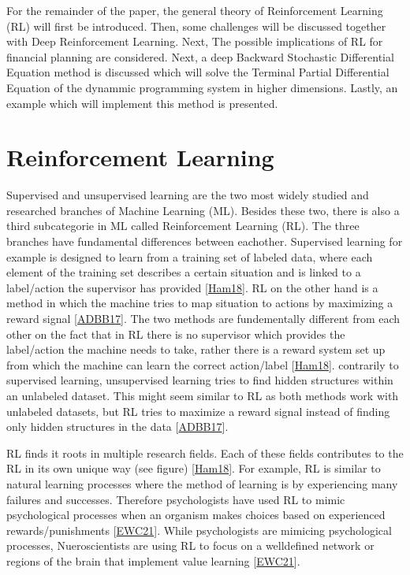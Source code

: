 \documentclass[letterpaper,10pt,english]{jupyterBook}
\begin{document}
\sphinxAtStartPar
For the remainder of the paper, the general theory of Reinforcement Learning (RL) will first be introduced. Then, some challenges will be discussed together with Deep Reinforcement Learning. Next, The possible implications of RL for financial planning are considered.  Next, a deep Backward Stochastic Differential Equation method is discussed which will solve the Terminal Partial Differential Equation of the dynammic programming system in higher dimensions. Lastly, an example which will implement this method is presented.


\section{Reinforcement Learning}
\label{\detokenize{Reinforcement_learning:reinforcement-learning}}\label{\detokenize{Reinforcement_learning::doc}}
\sphinxAtStartPar
Supervised and unsupervised learning are the two most widely studied and researched branches of Machine Learning (ML). Besides these two, there is also a third subcategorie in ML called Reinforcement Learning (RL). The three branches have fundamental differences between eachother. Supervised learning for example is designed to learn from a training set of labeled data, where each element of the training set describes a certain situation and is linked to a label/action the supervisor has provided {[}\hyperlink{cite.Financial_application:id50}{Ham18}{]}. RL on the other hand is a method in which the machine tries to map situation to actions by maximizing a reward signal {[}\hyperlink{cite.Financial_application:id51}{ADBB17}{]}. The two methods are fundementally different from each other on the fact that in RL there is no supervisor which provides the label/action the machine needs to take, rather there is a reward system set up from which the machine can learn the correct action/label {[}\hyperlink{cite.Financial_application:id50}{Ham18}{]}. contrarily to supervised learning, unsupervised learning tries to find hidden structures within an unlabeled dataset. This might seem similar to RL as both methods work with unlabeled datasets, but RL tries to maximize a reward signal instead of finding only hidden structures in the data {[}\hyperlink{cite.Financial_application:id51}{ADBB17}{]}.

\sphinxAtStartPar
RL finds it roots in multiple research fields. Each of these fields contributes to the RL in its own unique way (see figure) {[}\hyperlink{cite.Financial_application:id50}{Ham18}{]}. For example,  RL is similar to natural learning processes where the method of learning is by experiencing many failures and successes. Therefore psychologists have used RL to mimic psychological processes when an organism makes choices based on experienced rewards/punishments {[}\hyperlink{cite.Financial_application:id54}{EWC21}{]}. While psychologists are mimicing psychological processes, Nueroscientists are using RL to focus on a well\sphinxhyphen{}defined network or regions of the brain that implement value learning {[}\hyperlink{cite.Financial_application:id54}{EWC21}{]}.
\end{document}
